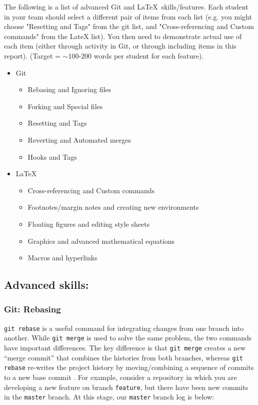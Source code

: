 \documentclass[a4paper, 11pt]{report}
\begin{document}
The following is a list of advanced Git and \LaTeX\ skills/features. Each student in your team should select a different pair of items from each list (e.g. you might choose "Resetting and Tags" from the git list, and "Cross-referencing and Custom commands" from the LateX list). You then need to demonstrate actual use of each item (either through activity in Git, or through including items in this report). (Target = $\sim$100-200 words per student for each feature).
\begin{itemize}
	\item Git
	\begin{itemize}
		\item Rebasing and Ignoring files
		\item Forking and Special files
		\item Resetting and Tags
		\item Reverting and Automated merges
		\item Hooks and Tags
	\end{itemize}
	\item \LaTeX\ 
	\begin{itemize}
		\item Cross-referencing and Custom commands
		\item Footnotes/margin notes and creating new environments
		\item Floating figures and editing style sheets
		\item Graphics and advanced mathematical equations
		\item Macros and hyperlinks
	\end{itemize}
\end{itemize}

\subsection{Advanced skills: \studA}

\subsubsection{Git: Rebasing}

\verb|git rebase| is a useful command for integrating changes from one branch into another. While \verb|git merge| is used to solve the same problem, the two commands have important differences. The key difference is that \verb|git merge| creates a new “merge commit” that combines the histories from both branches, whereas \verb|git rebase| re-writes the project history by moving/combining a sequence of commits to a new base commit \cite{mergingvrebasing}. For example, consider a repository in which you are developing a new feature on branch \verb|feature|, but there have been new commits in the \verb|master| branch. At this stage, our \verb|master| branch log is below:
\end{document}
